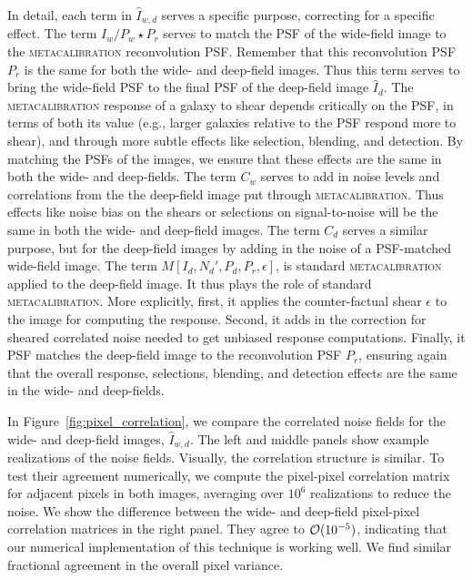 \documentclass[twocolumn]{openjournal}
\makeatletter
\newcommand{\mcal}{\textsc{metacalibration}\@\xspace}
\makeatother
\begin{document}
In detail, each term in $\hat I_{w,d}$ serves a specific purpose, correcting for a
specific effect. The term $I_{w}/P_{w} \star P_{r}$ serves to match the PSF of the
wide-field image to the \mcal reconvolution PSF. Remember that this reconvolution PSF
$P_r$ is the same for both the wide- and deep-field images. Thus this term serves to
bring the wide-field PSF to the final PSF of the deep-field image $\hat I_{d}$. The
\mcal response of a galaxy to shear depends critically on the PSF, in terms of both its
value (e.g., larger galaxies relative to the PSF respond more to shear), and through
more subtle effects like selection, blending, and detection. By matching the PSFs of the
images, we ensure that these effects are the same in both the wide- and deep-fields. The
term $C_{w}$ serves to add in noise levels and correlations from the the deep-field
image put through \mcal. Thus effects like noise bias on the shears or selections on
signal-to-noise will be the same in both the wide- and deep-field images. The term
$C_{d}$ serves a similar purpose, but for the deep-field images by adding in the noise
of a PSF-matched wide-field image. The term $M[I_{d}, N_{d}', P_{d}, P_{r}, \epsilon]$, is
standard \mcal applied to the deep-field image. It thus plays the role of standard
\mcal. More explicitly, first, it applies the counter-factual shear $\epsilon$ to the
image for computing the response. Second, it adds in the correction for sheared
correlated noise needed to get unbiased response computations. Finally, it PSF matches
the deep-field image to the reconvolution PSF $P_{r}$, ensuring again that the overall
response, selections, blending, and detection effects are the same in the wide- and
deep-fields.

In Figure~\ref{fig:pixel_correlation}, we compare the correlated noise fields for the
wide- and deep-field images, $\hat I_{w,d}$. The left and middle panels show example
realizations of the noise fields. Visually, the correlation structure is similar. To
test their agreement numerically, we compute the pixel-pixel correlation matrix for
adjacent pixels in both images, averaging over $10^6$ realizations to reduce the noise.
We show the difference between the wide- and deep-field pixel-pixel correlation matrices
in the right panel. They agree to ${\cal O}(10^{-5})$, indicating that our numerical
implementation of this technique is working well. We find similar fractional agreement
in the overall pixel variance.
\end{document}
